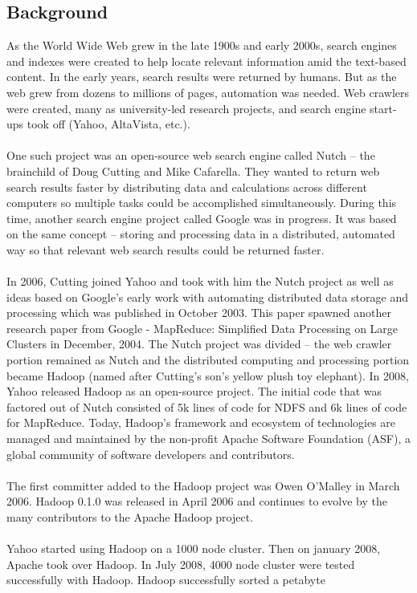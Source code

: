\documentclass[a4paper,12pt,oneside]{report}
\begin{document}
\subsection{Background}
As the World Wide Web grew in the late 1900s and early 2000s, search engines and indexes were created to help locate relevant information amid the text-based content. In the early years, search results were returned by humans. But as the web grew from dozens to millions of pages, automation was needed. Web crawlers were created, many as university-led research projects, and search engine start-ups took off (Yahoo, AltaVista, etc.).\\
\\
One such project was an open-source web search engine called Nutch – the brainchild of Doug Cutting and Mike Cafarella. They wanted to return web search results faster by distributing data and calculations across different computers so multiple tasks could be accomplished simultaneously. During this time, another search engine project called Google was in progress. It was based on the same concept – storing and processing data in a distributed, automated way so that relevant web search results could be returned faster.\\
\\
In 2006, Cutting joined Yahoo and took with him the Nutch project as well as ideas based on Google’s early work with automating distributed data storage and processing which was published in October 2003. This paper spawned another research paper from Google - MapReduce: Simplified Data Processing on Large Clusters in December, 2004. The Nutch project was divided – the web crawler portion remained as Nutch and the distributed computing and processing portion became Hadoop (named after Cutting’s son’s yellow plush toy elephant). In 2008, Yahoo released Hadoop as an open-source project. The initial code that was factored out of Nutch consisted of 5k lines of code for NDFS and 6k lines of code for MapReduce. Today, Hadoop’s framework and ecosystem of technologies are managed and maintained by the non-profit Apache Software Foundation (ASF), a global community of software developers and contributors.\\
\\
The first committer added to the Hadoop project was Owen O’Malley in March 2006. Hadoop 0.1.0 was released in April 2006 and continues to evolve by the many contributors to the Apache Hadoop project.\\
\\
Yahoo started using Hadoop on a 1000 node cluster. Then on january 2008, Apache took over Hadoop. In July 2008, 4000 node cluster were tested successfully with Hadoop. Hadoop successfully sorted a petabyte
\end{document}
